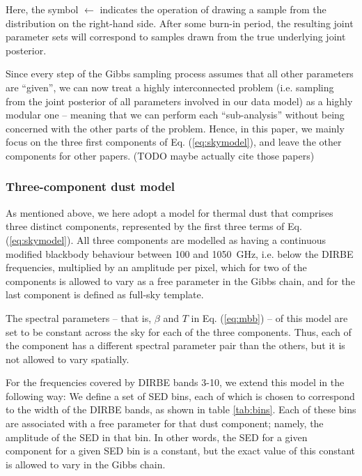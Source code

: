 \documentclass{aa}
\begin{document}
Here, the symbol $\leftarrow$ indicates the operation of drawing a sample from
the distribution on the right-hand side. After some burn-in period, the
resulting joint parameter sets will correspond to samples drawn from the true
underlying joint posterior.

Since every step of the Gibbs sampling process assumes that all other
parameters are ``given'', we can now treat a highly interconnected problem
(i.e. sampling from the joint posterior of all parameters involved in our data
model) as a highly modular one -- meaning that we can perform each
``sub-analysis'' without being concerned with the other parts of the problem.
Hence, in this paper, we mainly focus on the three first components of Eq.
(\ref{eq:skymodel}), and leave the other components for other papers. (TODO
maybe actually cite those papers)

\subsubsection{Three-component dust model}
As mentioned above, we here adopt a model for thermal dust that comprises three
distinct components, represented by the first three terms of Eq.
(\ref{eq:skymodel}). All three components are modelled as having a continuous
modified blackbody behaviour between 100 and 1050~GHz, i.e. below the DIRBE
frequencies, multiplied by an amplitude per pixel, which for two of the
components is allowed to vary as a free parameter in the Gibbs chain, and for
the last component is defined as full-sky template.

The spectral parameters -- that is, $\beta$ and $T$ in Eq. (\ref{eq:mbb}) -- of
this model are set to be constant across the sky for each of the three
components. Thus, each of the component has a different spectral parameter pair
than the others, but it is not allowed to vary spatially.

For the frequencies covered by DIRBE bands 3-10, we extend this model in the
following way: We define a set of SED bins, each of which is chosen to
correspond to the width of the DIRBE bands, as shown in table \ref{tab:bins}.
Each of these bins are associated with a free parameter for that dust
component; namely, the amplitude of the SED in that bin. In other words, the
SED for a given component for a given SED bin is a constant, but the exact
value of this constant is allowed to vary in the Gibbs chain.

\end{document}
